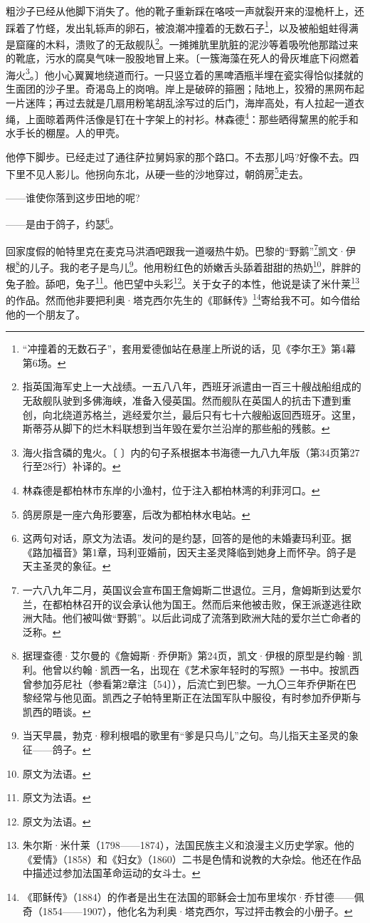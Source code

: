 \par 粗沙子已经从他脚下消失了。他的靴子重新踩在咯吱一声就裂开来的湿桅杆上，还踩着了竹蛏，发出轧轹声的卵石，被浪潮冲撞着的无数石子\footnote{“冲撞着的无数石子”，套用爱德伽站在悬崖上所说的话，见《李尔王》第4幕第6场。}，以及被船蛆蛀得满是窟窿的木料，溃败了的无敌舰队\footnote{指英国海军史上一大战绩。一五八八年，西班牙派遣由一百三十艘战船组成的无敌舰队驶到多佛海峡，准备入侵英国。然而舰队在英国人的抗击下遭到重创，向北绕道苏格兰，逃经爱尔兰，最后只有七十六艘船返回西班牙。这里，斯蒂芬从脚下的烂木料联想到当年毁在爱尔兰沿岸的那些船的残骸。}。一摊摊肮里肮脏的泥沙等着吸吮他那踏过来的靴底，污水的腐臭气味一股股地冒上来。〔一簇海藻在死人的骨灰堆底下闷燃着海火\footnote{海火指含磷的鬼火。〔 〕内的句子系根据本书海德一九八九年版（第34页第27行至28行）补译的。}。〕他小心翼翼地绕道而行。一只竖立着的黑啤酒瓶半埋在瓷实得恰似揉就的生面团的沙子里。奇渴岛上的岗哨。岸上是破碎的箍圈；陆地上，狡猾的黑网布起一片迷阵；再过去就是几扇用粉笔胡乱涂写过的后门，海岸高处，有人拉起一道衣绳，上面晾着两件活像是钉在十字架上的衬衫。林森德\footnote{林森德是都柏林市东岸的小渔村，位于注入都柏林湾的利菲河口。}：那些晒得黧黑的舵手和水手长的棚屋。人的甲壳。
\par 他停下脚步。已经走过了通往萨拉舅妈家的那个路口。不去那儿吗?好像不去。四下里不见人影儿。他拐向东北，从硬一些的沙地穿过，朝鸽房\footnote{鸽房原是一座六角形要塞，后改为都柏林水电站。}走去。
\par ——谁使你落到这步田地的呢?
\par ——是由于鸽子，约瑟\footnote{这两句对话，原文为法语。发问的是约瑟，回答的是他的未婚妻玛利亚。据《路加福音》第1章，玛利亚婚前，因天主圣灵降临到她身上而怀孕。鸽子是天主圣灵的象征。}。
\par 回家度假的帕特里克在麦克马洪酒吧跟我一道啜热牛奶。巴黎的“野鹅”\footnote{一六八九年二月，英国议会宣布国王詹姆斯二世退位。三月，詹姆斯到达爱尔兰，在都柏林召开的议会承认他为国王。然而后来他被击败，保王派遂逃往欧洲大陆。他们被叫做“野鹅”。以后此词成了流落到欧洲大陆的爱尔兰亡命者的泛称。}凯文·伊根\footnote{据理查德·艾尔曼的《詹姆斯·乔伊斯》第24页，凯文·伊根的原型是约翰·凯利。他曾以约翰·凯西一名，出现在《艺术家年轻时的写照》一书中。按凯西曾参加芬尼社（参看第2章注〔54〕），后流亡到巴黎。一九〇三年乔伊斯在巴黎经常与他见面。凯西之子帕特里斯正在法国军队中服役，有时参加乔伊斯与凯西的晤谈。}的儿子。我的老子是鸟儿\footnote{当天早晨，勃克·穆利根唱的歌里有“爹是只鸟儿”之句。鸟儿指天主圣灵的象征——鸽子。}。他用粉红色的娇嫩舌头舔着甜甜的热奶\footnote{原文为法语。}，胖胖的兔子脸。舔吧，兔子\footnote{原文为法语。}。他巴望中头彩\footnote{原文为法语。}。关于女子的本性，他说是读了米什莱\footnote{朱尔斯·米什莱（1798——1874），法国民族主义和浪漫主义历史学家。他的《爱情》（1858）和《妇女》（1860）二书是色情和说教的大杂烩。他还在作品中描述过参加法国革命运动的女斗士。}的作品。然而他非要把利奥·塔克西尔先生的《耶稣传》\footnote{《耶稣传》（1884）的作者是出生在法国的耶稣会士加布里埃尔·乔甘德——佩奇（1854——1907），他化名为利奥·塔克西尔，写过抨击教会的小册子。}寄给我不可。如今借给他的一个朋友了。
